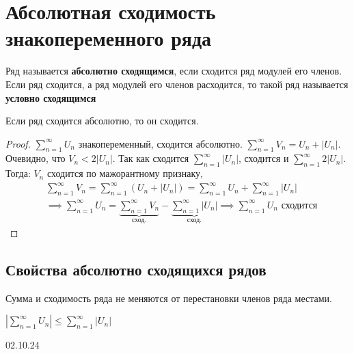 \section{Абсолютная сходимость знакопеременного ряда}
\begin{opr}
    Ряд называется \textbf{абсолютно сходящимся}, если сходится ряд модулей его членов.
    Если ряд сходится, а ряд модулей его членов расходится, то такой ряд называется 
    \textbf{условно сходящимся}
\end{opr}

\begin{thm}
    Если ряд сходится абсолютно, то он сходится.\\
    \begin{proof}
        \(\sum_{n=1}^{\infty}U_{n}\) знакопеременный, сходится абсолютно.
        \(\sum_{n=1}^{\infty}V_{n} = U_{n} + |U_{n}|\).
        Очевидно, что \(V_{n} < 2|U_{n}|\). 
        Так как сходится \(\sum_{n=1}^{\infty} |U_{n}|\), 
        сходится и \(\sum_{n=1}^{\infty} 2|U_{n}|\).
        Тогда: \(V_{n}\) сходится по мажорантному признаку,
        \begin{equation}
            \begin{align*}
                &\sum_{n=1}^{\infty}V_{n} = \sum_{n=1}^{\infty}(U_{n} + |U_{n}|) 
                = \sum_{n=1}^{\infty}U_{n} + \sum_{n=1}^{\infty}|U_{n}|\\
                &\implies \sum_{n=1}^{\infty}U_{n} 
                = \underbrace{\sum_{n=1}^{\infty}V_{n}}_{\text{сход.}} 
                - \underbrace{\sum_{n=1}^{\infty}|U_{n}|}_{\text{сход.}} 
                \implies \sum_{n=1}^{\infty}U_{n} \text{ сходится}
            \end{align*}
        \end{equation}
    \end{proof}
\end{thm}

\subsection{Свойства абсолютно сходящихся рядов}
\begin{sv}
    Сумма и сходимость ряда не меняются 
    от перестановки членов ряда местами.
\end{sv}

\begin{sv}
    \(|\sum_{n=1}^{\infty}U_{n}| \leq \sum_{n=1}^{\infty}|U_{n}|\)
\end{sv}



\vspace{2cm}
\begin{center}\large{02.10.24}\end{center}




